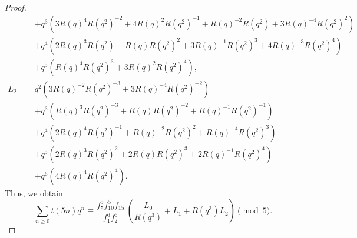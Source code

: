 \documentclass{amsart}
\theoremstyle{definition}
\def\myalpha{R(q)}
\def\mybeta{R(q^2)}
\def\mygamma{R(q^3)}
\newcommand{\tbar}{\overline{t}}
\begin{document}
\begin{proof}
\begin{align*}
&+q^3\!\left(3\myalpha^{4}\mybeta^{-2}+4\myalpha^{2}\mybeta^{-1}+\myalpha^{-2}\mybeta+3\myalpha^{-4}\mybeta^{2}\right)\\
&+q^4\!\left(2\myalpha^{3}\mybeta+\myalpha\mybeta^{2}+3\myalpha^{-1}\mybeta^{3}+4\myalpha^{-3}\mybeta^{4}\right)\\
&+q^5\!\left(\myalpha^{4}\mybeta^{3}+3\myalpha^{2}\mybeta^{4}\right),\\[3pt]
L_2={}&q^2\!\left(3\myalpha^{-2}\mybeta^{-3}+3\myalpha^{-4}\mybeta^{-2}\right)\\
&+q^3\!\left(\myalpha^{3}\mybeta^{-3}+\myalpha\mybeta^{-2}+\myalpha^{-1}\mybeta^{-1}\right)\\
&+q^4\!\left(2\myalpha^{4}\mybeta^{-1}+\myalpha^{-2}\mybeta^{2}+\myalpha^{-4}\mybeta^{3}\right)\\
&+q^5\!\left(2\myalpha^{3}\mybeta^{2}+2\myalpha\mybeta^{3}+2\myalpha^{-1}\mybeta^{4}\right)\\
&+q^6\!\left(4\myalpha^{4}\mybeta^{4}\right).
\end{align*}
Thus, we obtain
\begin{equation}
\sum_{n\geq0}\tbar(5n)q^n
\equiv\frac{f_5^{5}f_{10}^{5}f_{15}}{f_1^{6}f_2^{6}}\,
\left(\frac{L_0}{\mygamma}+L_1+\mygamma L_2\right)\pmod5.
\label{eq.L-GF}
\end{equation}


\end{proof}
\end{document}

